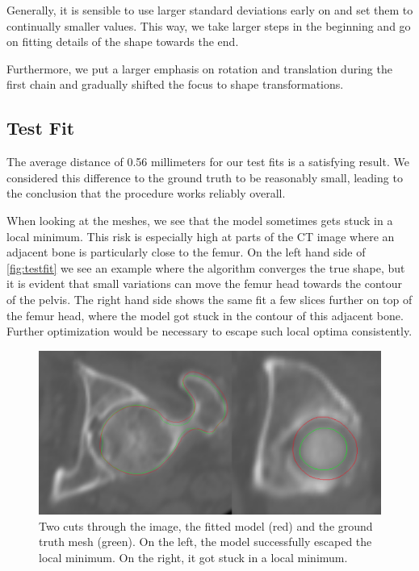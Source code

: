 Generally, it is sensible to use larger standard deviations early on and set them to continually smaller values.
This way, we take larger steps in the beginning and go on fitting details of the shape towards the end.

Furthermore, we put a larger emphasis on rotation and translation during the first chain and gradually shifted the focus to shape transformations.


\subsection{Test Fit}
\label{subsec:testfit}

The average distance of 0.56 millimeters for our test fits is a satisfying result.
We considered this difference to the ground truth to be reasonably small, leading to the conclusion that the procedure works reliably overall. 

When looking at the meshes, we see that the model sometimes gets stuck in a local minimum.
This risk is especially high at parts of the CT image where an adjacent bone is particularly close to the femur. 
On the left hand side of \autoref{fig:testfit} we see an example where the algorithm converges the true shape, but it is evident that small variations can move the femur head towards the contour of the pelvis.
The right hand side shows the same fit a few slices further on top of the femur head, where the model got stuck in the contour of this adjacent bone.
Further optimization would be necessary to escape such local optima consistently.

\begin{figure}
	\centering
  \includegraphics[width=\columnwidth]{./Figures/local_minimum_comparison}
  \caption{
    Two cuts through the image, the fitted model (red) and the ground truth mesh (green).
    On the left, the model successfully escaped the local minimum.
    On the right, it got stuck in a local minimum.
  }
  \label{fig:testfit}
\end{figure}

